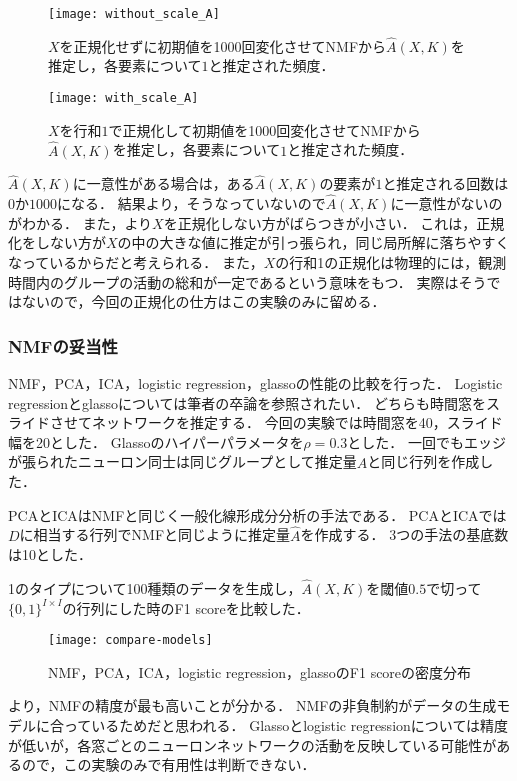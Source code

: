 \begin{figure}[htbp]
    \begin{minipage}{0.5\hsize}
			\begin{center}
					\texttt{[image: without\_scale\_A]}
					\caption{$X$を正規化せずに初期値を1000回変化させてNMFから$\hat{A}(X,K)$を推定し，各要素について$1$と推定された頻度．}
					\label{fig:without_scale_A}
			\end{center}
		\end{minipage}
    \begin{minipage}{0.5\hsize}
			\begin{center}
					\texttt{[image: with\_scale\_A]}
					\caption{$X$を行和$1$で正規化して初期値を1000回変化させてNMFから$\hat{A}(X,K)$を推定し，各要素について$1$と推定された頻度．}
					\label{fig:with_scale_A}
			\end{center}
		\end{minipage}
\end{figure}

$\hat{A}(X,K)$に一意性がある場合は，ある$\hat{A}(X,K)$の要素が$1$と推定される回数は$0$か$1000$になる．
結果より，そうなっていないので$\hat{A}(X,K)$に一意性がないのがわかる．
また，より$X$を正規化しない方がばらつきが小さい．
これは，正規化をしない方が$X$の中の大きな値に推定が引っ張られ，同じ局所解に落ちやすくなっているからだと考えられる．
また，$X$の行和1の正規化は物理的には，観測時間内のグループの活動の総和が一定であるという意味をもつ．
実際はそうではないので，今回の正規化の仕方はこの実験のみに留める．

\subsubsection{NMFの妥当性}
NMF，PCA，ICA，logistic regression，glassoの性能の比較を行った．
Logistic regressionとglassoについては筆者の卒論\cite{2018Nagayama}を参照されたい．
どちらも時間窓をスライドさせてネットワークを推定する．
今回の実験では時間窓を40，スライド幅を20とした．
Glassoのハイパーパラメータを$\rho = 0.3$とした．
一回でもエッジが張られたニューロン同士は同じグループとして推定量$\hat{A}$と同じ行列を作成した．

PCAとICAはNMFと同じく一般化線形成分分析の手法\cite{Cichocki2009}である．
PCAとICAでは$D$に相当する行列でNMFと同じように推定量$\hat{A}$を作成する．
3つの手法の基底数は10とした．

1のタイプについて100種類のデータを生成し，$\hat{A}(X,K)$を閾値$0.5$で切って$\{0,1\}^{I \times I}$の行列にした時のF1 scoreを比較した．
\begin{figure}[htbp]
    \begin{center}
        \texttt{[image: compare-models]}
        \caption{NMF，PCA，ICA，logistic regression，glassoのF1 scoreの密度分布}
        \label{fig:compare-models}
    \end{center}
\end{figure}
より，NMFの精度が最も高いことが分かる．
NMFの非負制約がデータの生成モデルに合っているためだと思われる．
Glassoとlogistic regressionについては精度が低いが，各窓ごとのニューロンネットワークの活動を反映している可能性があるので，この実験のみで有用性は判断できない．

